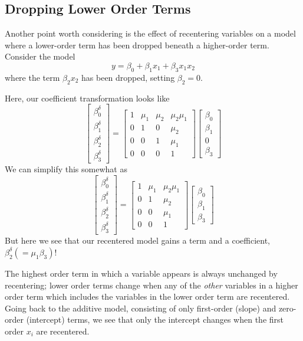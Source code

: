 \documentclass[]{article}
\begin{document}
\subsection{Dropping Lower Order
Terms}\label{dropping-lower-order-terms}

Another point worth considering is the effect of recentering variables
on a model where a lower-order term has been dropped beneath a
higher-order term. Consider the model
\[y = \beta_0 + \beta_1x_1 + \beta_3x_1x_2\] where the term
\(\beta_2x_2\) has been dropped, setting \(\beta_2=0\).

Here, our coefficient transformation looks like
\[\begin{bmatrix}\beta_0^\delta \\ \beta_1^\delta \\ \beta_2^\delta \\ \beta_3^\delta \end{bmatrix}=
\begin{bmatrix} 1 & \mu_1 &\mu_2 &\mu_2\mu_1 \\
  0 &1 &0 &\mu_2 \\ 0 &0 &1 &\mu_1 \\ 0 &0 &0 &1 \end{bmatrix}
\begin{bmatrix}\beta_0 \\ \beta_1 \\ 0 \\ \beta_3 \end{bmatrix}\] We can
simplify this somewhat as
\[\begin{bmatrix}\beta_0^\delta \\ \beta_1^\delta \\ \beta_2^\delta \\ \beta_3^\delta \end{bmatrix}=
\begin{bmatrix} 1 & \mu_1 &\mu_2\mu_1 \\
  0 &1 &\mu_2 \\ 0 &0 &\mu_1 \\ 0 &0 &1 \end{bmatrix}
\begin{bmatrix}\beta_0 \\ \beta_1 \\ \beta_3 \end{bmatrix}\] But here we
see that our recentered model gains a term and a coefficient,
\(\beta_2^\delta (=\mu_1\beta_3)\)!

The highest order term in which a variable appears is always unchanged
by recentering; lower order terms change when any of the \emph{other}
variables in a higher order term which includes the variables in the
lower order term are recentered. Going back to the additive model,
consisting of only first-order (slope) and zero-order (intercept) terms,
we see that only the intercept changes when the first order \(x_i\) are
recentered.
\end{document}
